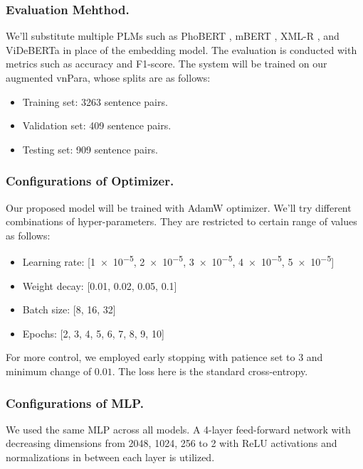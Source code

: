 \documentclass{llncs}
\begin{document}
\subsubsection{Evaluation Mehthod.} We'll substitute multiple PLMs such as PhoBERT \parencite{nguyen2020phobert}, mBERT \parencite{devlin2019bert}, XML-R \parencite{conneau2020xmlr}, and ViDeBERTa \parencite{tran2023videberta} in place of the embedding model. The evaluation is conducted with metrics such as accuracy and F1-score. The system will be trained on our augmented vnPara, whose splits are as follows:
    \begin{itemize}
        \item Training set: 3263 sentence pairs.
        \item Validation set: 409 sentence pairs.
        \item Testing set: 909 sentence pairs.
    \end{itemize}

\subsubsection{Configurations of Optimizer.} Our proposed model will be trained with AdamW \parencite{loshchilov2019} optimizer. We'll try different combinations of hyper-parameters. They are restricted to certain range of values as follows:
    \begin{itemize}
        \item Learning rate: [\num{1e-5}, \num{2e-5}, \num{3e-5}, \num{4e-5}, \num{5e-5}]
        \item Weight decay: [0.01, 0.02, 0.05, 0.1]
        \item Batch size: [8, 16, 32]
        \item Epochs: [2, 3, 4, 5, 6, 7, 8, 9, 10]
    \end{itemize}
    
    For more control, we employed early stopping with patience set to $3$ and minimum change of $0.01$. The loss here is the standard cross-entropy.
    
\subsubsection{Configurations of MLP.} We used the same MLP across all models. A 4-layer feed-forward network with decreasing dimensions from 2048, 1024, 256 to 2 with ReLU activations and normalizations in between each layer is utilized.
\end{document}
